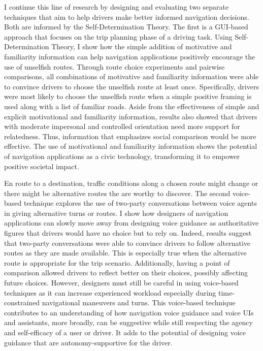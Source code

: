 I continue this line of research by designing and evaluating two separate techniques that aim to help drivers make better informed navigation decisions. Both are informed by the Self-Determination Theory. The first is a GUI-based approach that focuses on the trip planning phase of a driving task. Using Self-Determination Theory, I show how the simple addition of motivative and familiarity information can help navigation applications positively encourage the use of unselfish routes. Through route choice experiments and pairwise comparisons, all combinations of motivative and familiarity information were able to convince drivers to choose the unselfish route at least once. Specifically, drivers were most likely to choose the unselfish route when a simple positive framing is used along with a list of familiar roads. Aside from the effectiveness of simple and explicit motivational and familiarity information, results also showed that drivers with moderate impersonal and controlled orientation need more support for relatedness. Thus, information that emphasizes social comparison would be more effective. The use of motivational and familiarity information shows the potential of navigation applications as a civic technology, transforming it to empower positive societal impact. 

En route to a destination, traffic conditions along a chosen route might change or there might be alternative routes the are worthy to discover. The second voice-based technique explores the use of two-party conversations between voice agents in giving alternative turns or routes. I show how designers of navigation applications can slowly move away from designing voice guidance as authoritative figures that drivers would have no choice but to rely on. Indeed, results suggest that two-party conversations were able to convince drivers to follow alternative routes as they are made available. This is especially true when the alternative route is appropriate for the trip scenario. Additionally, having a point of comparison allowed drivers to reflect better on their choices, possibly affecting future choices. However, designers must still be careful in using voice-based techniques as it can increase experienced workload especially during time-constrained navigational maneuvers and turns. This voice-based technique contributes to an understanding of how navigation voice guidance and voice UIs and assistants, more broadly, can be suggestive while still respecting the agency and self-efficacy of a user or driver. It adds to the potential of designing voice guidance that are autonomy-supportive for the driver.

